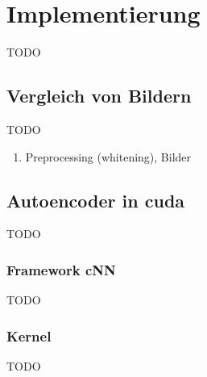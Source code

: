 \chapter{Implementierung}

TODO

\section{Vergleich von Bildern}

TODO

\begin{enumerate}
	\item Preprocessing (whitening), Bilder
\end{enumerate}

\section{Autoencoder in cuda}

TODO

\subsection{Framework cNN}

TODO

\subsection{Kernel}

TODO